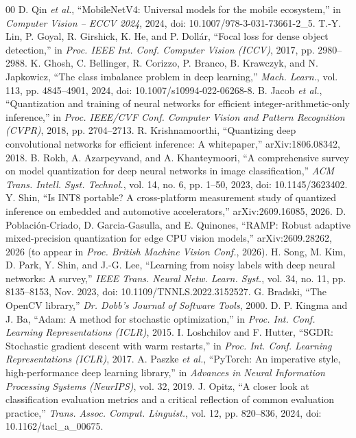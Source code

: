 \documentclass[conference]{IEEEtran}
\begin{document}
\begin{thebibliography}{00}
 D. Qin \emph{et al.}, ``MobileNetV4: Universal models for the mobile ecosystem,'' in \emph{Computer Vision -- ECCV 2024}, 2024, doi: 10.1007/978-3-031-73661-2\_5. 
 T.-Y. Lin, P. Goyal, R. Girshick, K. He, and P. Doll\'ar, ``Focal loss for dense object detection,'' in \emph{Proc. IEEE Int. Conf. Computer Vision (ICCV)}, 2017, pp. 2980--2988. 
 K. Ghosh, C. Bellinger, R. Corizzo, P. Branco, B. Krawczyk, and N. Japkowicz, ``The class imbalance problem in deep learning,'' \emph{Mach. Learn.}, vol. 113, pp. 4845--4901, 2024, doi: 10.1007/s10994-022-06268-8. 
 B. Jacob \emph{et al.}, ``Quantization and training of neural networks for efficient integer-arithmetic-only inference,'' in \emph{Proc. IEEE/CVF Conf. Computer Vision and Pattern Recognition (CVPR)}, 2018, pp. 2704--2713. 
 R. Krishnamoorthi, ``Quantizing deep convolutional networks for efficient inference: A whitepaper,'' arXiv:1806.08342, 2018. 
 B. Rokh, A. Azarpeyvand, and A. Khanteymoori, ``A comprehensive survey on model quantization for deep neural networks in image classification,'' \emph{ACM Trans. Intell. Syst. Technol.}, vol. 14, no. 6, pp. 1--50, 2023, doi: 10.1145/3623402.
 Y. Shin, ``Is INT8 portable? A cross-platform measurement study of quantized inference on embedded and automotive accelerators,'' arXiv:2609.16085, 2026. 
 D. Poblaci\'on-Criado, D. Garcia-Gasulla, and E. Quinones, ``RAMP: Robust adaptive mixed-precision quantization for edge CPU vision models,'' arXiv:2609.28262, 2026 (to appear in \emph{Proc. British Machine Vision Conf.}, 2026). 
 H. Song, M. Kim, D. Park, Y. Shin, and J.-G. Lee, ``Learning from noisy labels with deep neural networks: A survey,'' \emph{IEEE Trans. Neural Netw. Learn. Syst.}, vol. 34, no. 11, pp. 8135--8153, Nov. 2023, doi: 10.1109/TNNLS.2022.3152527.
 G. Bradski, ``The OpenCV library,'' \emph{Dr. Dobb's Journal of Software Tools}, 2000.
 D. P. Kingma and J. Ba, ``Adam: A method for stochastic optimization,'' in \emph{Proc. Int. Conf. Learning Representations (ICLR)}, 2015. 
 I. Loshchilov and F. Hutter, ``SGDR: Stochastic gradient descent with warm restarts,'' in \emph{Proc. Int. Conf. Learning Representations (ICLR)}, 2017. 
 A. Paszke \emph{et al.}, ``PyTorch: An imperative style, high-performance deep learning library,'' in \emph{Advances in Neural Information Processing Systems (NeurIPS)}, vol. 32, 2019.
 J. Opitz, ``A closer look at classification evaluation metrics and a critical reflection of common evaluation practice,'' \emph{Trans. Assoc. Comput. Linguist.}, vol. 12, pp. 820--836, 2024, doi: 10.1162/tacl\_a\_00675. 
\end{thebibliography}
\end{document}
